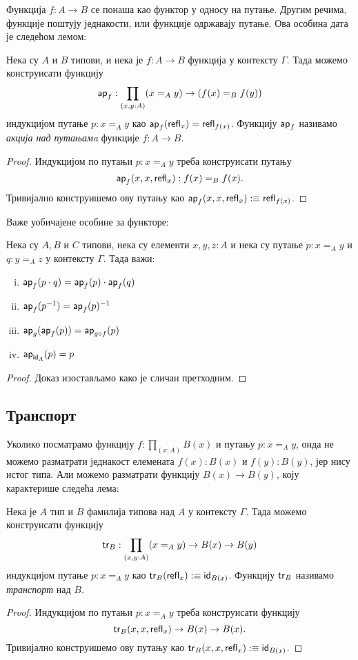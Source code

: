\documentclass[12pt,oneside]{memoir}
\begin{document}
Функција $f : A \to B$ се понаша као функтор у односу на путање. Другим речима, функције поштују једнакости, или функције одржавају путање. Ова особина дата је следећом лемом:

\begin{lemma}
    Нека су $A$ и $B$ типови, и нека је $f : A \to B$ функција у контексту $\Gamma$. Тада можемо конструисати функцију 
    \[\mathsf{ap}_{f} : \prod_{(x,y:A)} (x =_{A} y) \to (f (x) =_{B} f (y))\]
    индукцијом путање $p : x =_{A} y$ као $\mathsf{ap}_{f} (\mathsf{refl}_{x}) = \mathsf{refl}_{f(x)}$. Функцију $\mathsf{ap}_{f}$ називамо \emph{акција над путањамa} функције $f : A \to B$.
\end{lemma}
\begin{proof}
    Индукцијом по путањи $p : x =_{A} y$ треба конструисати путању
    \[\mathsf{ap}_{f} (x, x, \mathsf{refl}_{x}) : f(x) =_B f(x).\]
    Тривијално конструишемо ову путању као $\mathsf{ap}_{f} (x, x, \mathsf{refl}_{x}) :\equiv \mathsf{refl}_{f(x)}$.
\end{proof}

Важе уобичајене особине за функторе:

\begin{lemma}
    Нека су $A, B$ и $C$ типови, нека су елементи $x, y, z : A$ и нека су путање $p : x =_A y$ и $q : y =_A z$ у контексту $\Gamma$. Тада важи:
    \begin{enumerate}[(i)]
        \item $\mathsf{ap}_{f} (p \cdot q) = \mathsf{ap}_{f}(p) \cdot \mathsf{ap}_{f}(q)$
        \item $\mathsf{ap}_{f} (p^{-1}) = \mathsf{ap}_{f}(p)^{-1}$
        \item $\mathsf{ap}_{g} (\mathsf{ap}_{f} (p)) = \mathsf{ap}_{g \circ f} (p)$
        \item $\mathsf{ap}_{\mathsf{id}_{A}} (p) = p$
    \end{enumerate}
\end{lemma}
\begin{proof}
    Доказ изостављамо како је сличан претходним.
\end{proof}

\subsection{Транспорт}

Уколико посматрамо функцију $f : \prod_{(x : A)} B(x)$ и путању $p : x =_A y$, онда не можемо разматрати једнакост елемената $f(x) : B(x)$ и $f(y) : B(y)$, јер нису истог типа. Али можемо разматрати функцију $B(x) \to B(y)$, коју карактерише следећа лема:

\begin{lemma}
    Нека је $A$ тип и $B$ фамилија типова над $A$ у контексту $\Gamma$. Тада можемо конструисати функцију
    \[\mathsf{tr}_{B} : \prod_{(x,y:A)} (x =_{A} y) \to B(x) \to B(y)\]
    индукцијом путање $p : x =_{A} y$ као $\mathsf{tr}_{B}(\mathsf{refl}_{x}) :\equiv \mathsf{id}_{B(x)}$.
Функцију $\mathsf{tr}_{B}$ називамо \emph{транспорт} над $B$.
\end{lemma}
\begin{proof}
    Индукцијом по путањи $p : x =_{A} y$ треба конструисати функцију
    \[\mathsf{tr}_{B}(x, x, \mathsf{refl}_{x}) \to B(x) \to B(x).\]
    Тривијално конструишемо ову путању као $\mathsf{tr}_{B} (x, x, \mathsf{refl}_{x}) :\equiv \mathsf{id}_{B(x)}$.
\end{proof}
\end{document}
